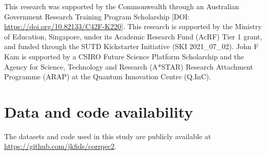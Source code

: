 \documentclass[a4paper,onecolumn,11pt,unpublished]{quantumarticle}
\theoremstyle{definition}
\theoremstyle{definition}
\begin{document}
\clearpage

\tableofcontents

















\begin{acknowledgments}
This research was supported by the Commonwealth through an Australian Government Research Training Program Scholarship [DOI: \url{https://doi.org/10.82133/C42F-K220}]. This research is supported by the Ministry of Education, Singapore, under its Academic Research Fund (AcRF) Tier 1 grant, and funded through the SUTD Kickstarter Initiative (SKI 2021\_07\_02). John F Kam is supported by a CSIRO Future Science Platform Scholarship and the Agency for Science, Technology and Research (A*STAR) Research Attachment Programme (ARAP) at the Quantum Innovation Centre (Q.InC).
\end{acknowledgments}

\section*{Data and code availability}
The datasets and code used in this study are publicly available at \url{https://github.com/jkfids/corrqec2}.

\printbibliography

\onecolumn\newpage
\appendix
{}
\renewcommand{\theequation}{\Alph{section}\arabic{equation}}






\end{document}
